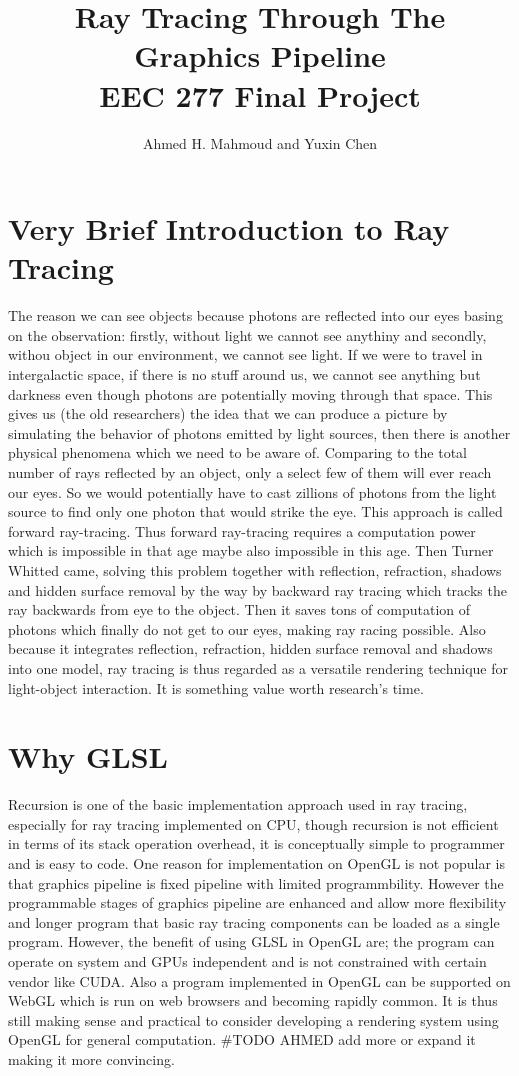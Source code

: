 \documentclass[a4paper,10pt]{article}
\title{Ray Tracing Through The Graphics Pipeline\\ 
 EEC 277 Final Project}
\author{Ahmed H. Mahmoud and Yuxin Chen}
\begin{document}
\maketitle

\section{Very Brief Introduction to Ray Tracing}
The reason we can see objects because photons are reflected into our eyes basing on the observation: firstly, without light we cannot see anythiny and secondly, withou object in our environment, we cannot see light. If we were to travel in intergalactic space, if there is no stuff around us, we cannot see anything but darkness even though photons are potentially moving through that space. This gives us (the old researchers) the idea that we can produce a picture by simulating the behavior of photons emitted by light sources, then there is another physical phenomena which we need to be aware of. Comparing to the total number of rays reflected by an object, only a select few of them will ever reach our eyes. So we would potentially have to cast zillions of photons from the light source to find only one photon that would strike the eye. This approach is called forward ray-tracing. Thus forward ray-tracing requires a computation power which is impossible in that age maybe also impossible in this age. Then Turner Whitted \cite{whitted2005improved} came, solving this problem together with reflection, refraction, shadows and hidden surface removal by the way by backward ray tracing which tracks the ray backwards from eye to the object. Then it saves tons of computation of photons which finally do not get to our eyes, making ray racing possible. Also because it integrates reflection, refraction, hidden surface removal and shadows into one model, ray tracing is thus regarded as a versatile rendering technique for light-object interaction. It is something value worth research's time.
\section{Why GLSL}

Recursion is one of the basic implementation approach used in ray tracing, especially for ray tracing implemented on CPU, though recursion is not efficient in terms of its stack operation overhead, it is conceptually simple to programmer and is easy to code. One reason for implementation on OpenGL is not popular is that graphics pipeline is fixed pipeline with limited programmbility. However the programmable stages of graphics pipeline are enhanced and allow more flexibility and longer program that basic ray tracing components can be loaded as a single program. However, the benefit of using GLSL in OpenGL are; the program can operate on system and GPUs independent and is not constrained with certain vendor like CUDA. Also a program implemented in OpenGL can be supported on WebGL which is run on web browsers and becoming rapidly common. It is thus still making sense and practical to consider developing a rendering system using OpenGL for general computation.
\#TODO AHMED add more or expand it making it more convincing. 
\end{document}

